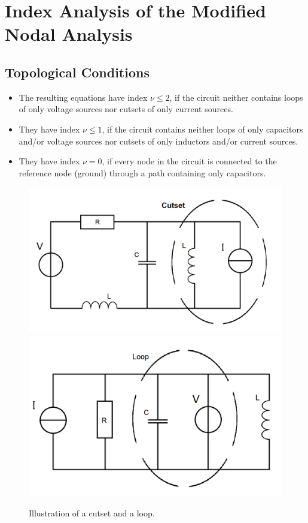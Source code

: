 	

\section*{Index Analysis of the Modified Nodal Analysis}
	\subsection{Topological Conditions}
	
	\begin{frame}
		\begin{itemize}
			\vfill
			\item The resulting equations have index $\nu \leq 2$, if the circuit neither contains loops of only voltage sources nor cutsets of only current sources.
			\item They have index $\nu \leq 1$, if the circuit contains neither loops of only capacitors and/or voltage sources nor cutsets of only inductors and/or current sources.
			\item They have index $\nu = 0$, if every node in the circuit is connected to the reference node (ground) through a path containing only capacitors.
			\vfill
		\end{itemize}
	\end{frame}

	\begin{frame}
		\vfill
		\begin{figure}
			\includegraphics[width=0.475\linewidth]{../TeX/pictures/inductance-current-source_cutset.png}
			\hfill
			\includegraphics[width=0.475\linewidth]{../Tex/pictures/capacitance-voltage-source_loop.png}
			\caption{Illustration of a cutset and a loop.}
			\label{fig:cutset and loop}
		\end{figure}
		\vfill
	\end{frame}
	
